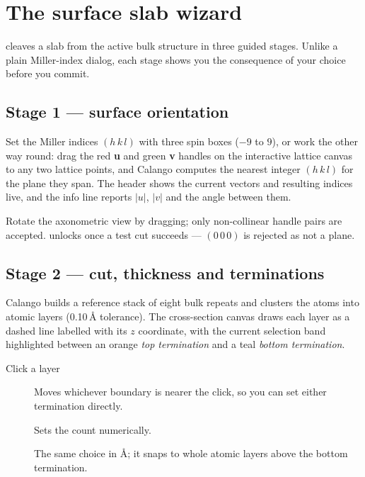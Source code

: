\section{The surface slab wizard}
\label{sec:slab-wizard}

\menusep{} cleaves a slab from the active bulk
structure in three guided stages. Unlike a plain Miller-index dialog, each
stage shows you the consequence of your choice before you commit.

\subsection{Stage 1 --- surface orientation}

Set the Miller indices $(h\,k\,l)$ with three spin boxes ($-9$ to $9$), or
work the other way round: drag the red \textbf{u} and green \textbf{v}
handles on the interactive lattice canvas to any two lattice points, and
Calango computes the nearest integer $(h\,k\,l)$ for the plane they span.
The header shows the current vectors and resulting indices live, and the
info line reports $|u|$, $|v|$ and the angle between them.

Rotate the axonometric view by dragging; only non-collinear handle pairs
are accepted.  unlocks once a test cut succeeds --- $(0\,0\,0)$ is
rejected as not a plane.

\subsection{Stage 2 --- cut, thickness and terminations}

Calango builds a reference stack of eight bulk repeats and clusters the
atoms into atomic layers (0.10\,\AA{} tolerance). The cross-section canvas
draws each layer as a dashed line labelled with its $z$ coordinate, with
the current selection band highlighted between an orange \emph{top
termination} and a teal \emph{bottom termination}.

\begin{description}
  \item[Click a layer] Moves whichever boundary is nearer the click, so you
    can set either termination directly.
  \item[] Sets the count numerically.
  \item[] The same choice in \AA{}; it snaps to whole atomic
    layers above the bottom termination.
\end{description}

